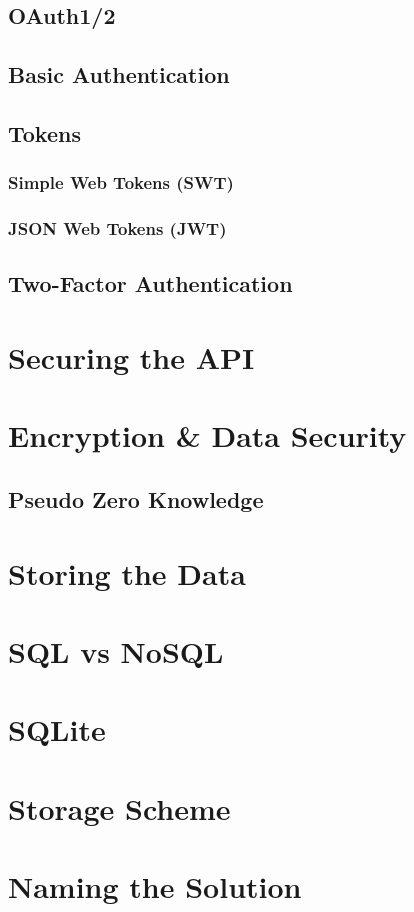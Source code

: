 		\subsection{OAuth1/2}
		\subsection{Basic Authentication}
		\subsection{Tokens}
			\subsubsection{Simple Web Tokens (SWT)}
			\subsubsection{JSON Web Tokens (JWT)}
		
		\subsection{Two-Factor Authentication}

	\section{Securing the API}

	\section{Encryption \& Data Security}
		\subsection{Pseudo Zero Knowledge}


	\section{Storing the Data}
		\section{SQL vs NoSQL}
		\section{SQLite}
	\section{Storage Scheme}

	\section{Naming the Solution}

